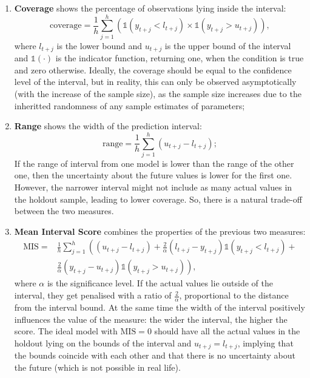 \documentclass[
]{book}
\providecommand{\tightlist}{%
  \setlength{\itemsep}{0pt}\setlength{\parskip}{0pt}}
\theoremstyle{definition}
\theoremstyle{definition}
\theoremstyle{definition}
\theoremstyle{definition}
\theoremstyle{remark}
\begin{document}
\begin{enumerate}
\def\labelenumi{\arabic{enumi}.}
\tightlist
\item
  \textbf{Coverage} shows the percentage of observations lying inside the interval:
  \begin{equation}
   \mathrm{coverage} = \frac{1}{h} \sum_{j=1}^h \left( \mathbb{1}(y_{t+j} < l_{t+j}) \times \mathbb{1}(y_{t+j} > u_{t+j}) \right),
   \label{eq:coverage}
  \end{equation}
  where \(l_{t+j}\) is the lower bound and \(u_{t+j}\) is the upper bound of the interval and \(\mathbb{1}(\cdot)\) is the indicator function, returning one, when the condition is true and zero otherwise. Ideally, the coverage should be equal to the confidence level of the interval, but in reality, this can only be observed asymptotically (with the increase of the sample size), as the sample size increases due to the inheritted randomness of any sample estimates of parameters;
\item
  \textbf{Range} shows the width of the prediction interval:
  \begin{equation}
   \mathrm{range} = \frac{1}{h} \sum_{j=1}^h (u_{t+j} -l_{t+j});
   \label{eq:range}
  \end{equation}
  If the range of interval from one model is lower than the range of the other one, then the uncertainty about the future values is lower for the first one. However, the narrower interval might not include as many actual values in the holdout sample, leading to lower coverage. So, there is a natural trade-off between the two measures.
\item
  \textbf{Mean Interval Score} \citep{Gneiting2007} combines the properties of the previous two measures:
  \begin{equation}
   \begin{aligned}
   \mathrm{MIS} = & \frac{1}{h} \sum_{j=1}^h \left( (u_{t+j} -l_{t+j}) + \frac{2}{\alpha} (l_{t+j} -y_{t+j}) \mathbb{1}(y_{t+j} < l_{t+j}) +\right. \\
   & \left. \frac{2}{\alpha} (y_{t+j} -u_{t+j}) \mathbb{1}(y_{t+j} > u_{t+j}) \right) ,
   \end{aligned}
   \label{eq:MIS}
  \end{equation}
  where \(\alpha\) is the significance level. If the actual values lie outside of the interval, they get penalised with a ratio of \(\frac{2}{\alpha}\), proportional to the distance from the interval bound. At the same time the width of the interval positively influences the value of the measure: the wider the interval, the higher the score. The ideal model with \(\mathrm{MIS}=0\) should have all the actual values in the holdout lying on the bounds of the interval and \(u_{t+j}=l_{t+j}\), implying that the bounds coincide with each other and that there is no uncertainty about the future (which is not possible in real life).

\end{enumerate}
\end{document}
